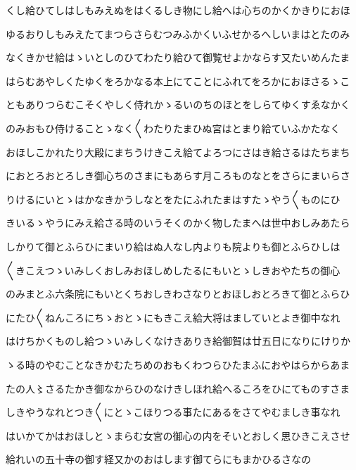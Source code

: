 \documentclass[a4paper,11pt,landscape]{ltjtarticle}
\begin{document}
くし給ひてしはしもみえぬをはくるしき物にし給へは心ちのかくかきりにおほ
\par\medskip
ゆるおりしもみえたてまつらさらむつみふかくいふせかるへしいまはとたのみ
\par\medskip
なくきかせ給はゝいとしのひてわたり給ひて御覧せよかならす又たいめんたま
\par\medskip
はらむあやしくたゆくをろかなる本上にてことにふれてをろかにおほさるゝこ
\par\medskip
ともありつらむこそくやしく侍れかゝるいのちのほとをしらてゆくすゑなかく
\par\medskip
のみおもひ侍けることゝなく〱わたりたまひぬ宮はとまり給ていふかたなく
\par\medskip
おほしこかれたり大殿にまちうけきこえ給てよろつにさはき給さるはたちまち
\par\medskip
におとろおとろしき御心ちのさまにもあらす月ころものなとをさらにまいらさ
\par\medskip
りけるにいとゝはかなきかうしなとをたにふれたまはすたゝやう〱ものにひ
\par\medskip
きいるゝやうにみえ給さる時のいうそくのかく物したまへは世中おしみあたら
\par\medskip
しかりて御とふらひにまいり給はぬ人なし内よりも院よりも御とふらひしは
\par\medskip
〱きこえつゝいみしくおしみおほしめしたるにもいとゝしきおやたちの御心
\par\medskip
のみまとふ六条院にもいとくちおしきわさなりとおほしおとろきて御とふらひ
\par\medskip
にたひ〱ねんころにちゝおとゝにもきこえ給大将はましていとよき御中なれ
\par\medskip
はけちかくものし給つゝいみしくなけきありき給御賀は廿五日になりにけりか
\par\medskip
ゝる時のやむことなきかむたちめのおもくわつらひたまふにおやはらからあま
\par\medskip
たの人〻さるたかき御なからひのなけきしほれ給へるころをひにてものすさま
\par\medskip
しきやうなれとつき〱にとゝこほりつる事たにあるをさてやむましき事なれ
\par\medskip
はいかてかはおほしとゝまらむ女宮の御心の内をそいとおしく思ひきこえさせ
\par\medskip
給れいの五十寺の御す経又かのおはします御てらにもまかひるさなの
\par\medskip
\end{document}
